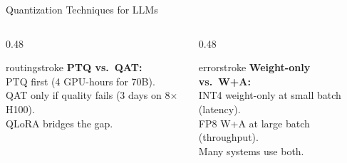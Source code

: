 \documentclass[aspectratio=169, 12pt]{beamer}
\begin{document}
\begin{frame}{Quantization Techniques for LLMs}
\vspace{0.15cm}
\begin{columns}[T]
  \begin{column}{0.48\textwidth}
    \begin{mlsyscard}{routingstroke}
    \textbf{PTQ vs.\ QAT:}\\
    {\scriptsize PTQ first (4 GPU-hours for 70B).\\
    QAT only if quality fails (3 days on 8$\times$H100).\\
    QLoRA bridges the gap.}
    \end{mlsyscard}
  \end{column}
  \begin{column}{0.48\textwidth}
    \begin{mlsyscard}{errorstroke}
    \textbf{Weight-only vs.\ W+A:}\\
    {\scriptsize INT4 weight-only at small batch (latency).\\
    FP8 W+A at large batch (throughput).\\
    Many systems use both.}
    \end{mlsyscard}
  \end{column}
\end{columns}

\end{frame}
\end{document}
